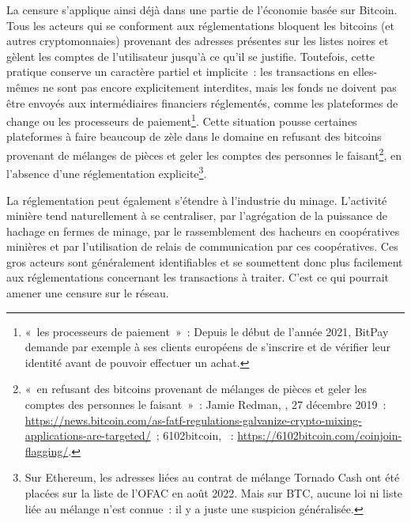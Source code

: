 La censure s'applique ainsi déjà dans une partie de l'économie basée sur Bitcoin. Tous les acteurs qui se conforment aux réglementations bloquent les bitcoins (et autres cryptomonnaies) provenant des adresses présentes sur les listes noires et gèlent les comptes de l'utilisateur jusqu'à ce qu'il se justifie. Toutefois, cette pratique conserve un caractère partiel et implicite~: les transactions en elles-mêmes ne sont pas encore explicitement interdites, mais les fonds ne doivent pas être envoyés aux intermédiaires financiers réglementés, comme les plateformes de change ou les processeurs de paiement\footnote{«~les processeurs de paiement~»~: Depuis le début de l'année 2021, BitPay demande par exemple à ses clients européens de s'inscrire et de vérifier leur identité avant de pouvoir effectuer un achat.}. Cette situation pousse certaines plateformes à faire beaucoup de zèle dans le domaine en refusant des bitcoins provenant de mélanges de pièces et geler les comptes des personnes le faisant\footnote{«~en refusant des bitcoins provenant de mélanges de pièces et geler les comptes des personnes le faisant~»~: Jamie Redman, , 27 décembre 2019~: \url{https://news.bitcoin.com/as-fatf-regulations-galvanize-crypto-mixing-applications-are-targeted/}~; 6102bitcoin, ~: \url{https://6102bitcoin.com/coinjoin-flagging/}.}, en l'absence d'une réglementation explicite\footnote{Sur Ethereum, les adresses liées au contrat de mélange Tornado Cash ont été placées sur la liste de l'OFAC en août 2022. Mais sur BTC, aucune loi ni liste liée au mélange n'est connue~: il y a juste une suspicion généralisée.}.

La réglementation peut également s'étendre à l'industrie du minage. L'activité minière tend naturellement à se centraliser, par l'agrégation de la puissance de hachage en fermes de minage, par le rassemblement des hacheurs en coopératives minières et par l'utilisation de relais de communication par ces coopératives. Ces gros acteurs sont généralement identifiables et se soumettent donc plus facilement aux réglementations concernant les transactions à traiter. C'est ce qui pourrait amener une censure sur le réseau.

